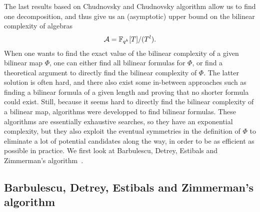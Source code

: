 The last results based on Chudnovsky and Chudnovsky algorithm allow us to find
one decomposition, and thus give us an (asymptotic) upper bound on the bilinear
complexity of algebras
\[
  \mathcal{A} = \mathbb{F}_{q^k}[T]/(T^l).
\]
When one wants to find the exact value of the bilinear complexity of a given
bilinear map $\Phi$, one can either find all bilinear formulas for $\Phi$, or
find a theoretical argument to directly find the bilinear complexity of $\Phi$. The latter
solution is often hard, and there also exist some in-between approaches such
as finding a bilinear formula of a given length and proving that no shorter formula
could exist. Still, because it seems hard to directly find the bilinear
complexity of a bilinear map, algorithms were developped to find bilinear
formulas. These algorithms are essentially exhaustive searches, so they 
have an exponential complexity, but they also exploit the eventual symmetries
in the definition of $\Phi$ to eliminate a lot of potential candidates along the
way, in order to be as efficient as possible in practice. We first look at
Barbulescu, Detrey, Estibals and Zimmerman's algorithm~\cite{BDEZ12}.

\subsection{Barbulescu, Detrey, Estibals and Zimmerman's algorithm}

